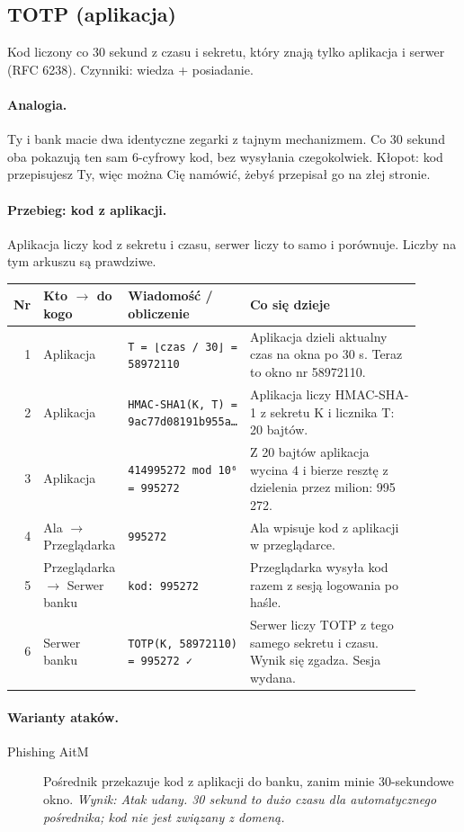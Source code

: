 \subsection{TOTP (aplikacja)}
\label{sec:mech-totp}
Kod liczony co 30 sekund z czasu i sekretu, który znają tylko aplikacja i serwer (RFC 6238). Czynniki: wiedza + posiadanie. \cite{S3,S4,N1,A1,P7,P8,N4}

\paragraph{Analogia.} Ty i bank macie dwa identyczne zegarki z tajnym mechanizmem. Co 30 sekund oba pokazują ten sam 6-cyfrowy kod, bez wysyłania czegokolwiek. Kłopot: kod przepisujesz Ty, więc można Cię namówić, żebyś przepisał go na złej stronie.

\paragraph{Przebieg: kod z aplikacji.} Aplikacja liczy kod z sekretu i czasu, serwer liczy to samo i porównuje. Liczby na tym arkuszu są prawdziwe.
\begingroup\footnotesize
\begin{longtable}{@{}r p{0.2\linewidth} p{0.24\linewidth} p{0.46\linewidth}@{}}
\toprule
Nr & Kto $\rightarrow$ do kogo & Wiadomość / obliczenie & Co się dzieje \\
\midrule
\endhead
1 & Aplikacja & \texttt{T = ⌊czas / 30⌋ = 58972110} & Aplikacja dzieli aktualny czas na okna po 30 s. Teraz to okno nr 58972110. \\
2 & Aplikacja & \texttt{HMAC-SHA1(K, T) = 9ac77d08191b955a…} & Aplikacja liczy HMAC-SHA-1 z sekretu K i licznika T: 20 bajtów. \\
3 & Aplikacja & \texttt{414995272 mod 10⁶ = 995272} & Z 20 bajtów aplikacja wycina 4 i bierze resztę z dzielenia przez milion: 995 272. \\
4 & Ala $\rightarrow$ Przeglądarka & \texttt{995272} & Ala wpisuje kod z aplikacji w przeglądarce. \\
5 & Przeglądarka $\rightarrow$ Serwer banku & \texttt{kod: 995272} & Przeglądarka wysyła kod razem z sesją logowania po haśle. \\
6 & Serwer banku & \texttt{TOTP(K, 58972110) = 995272 ✓} & Serwer liczy TOTP z tego samego sekretu i czasu. Wynik się zgadza. Sesja wydana. \\
\bottomrule
\end{longtable}
\endgroup

\paragraph{Warianty ataków.}
\begin{description}
\item[Phishing AitM] Pośrednik przekazuje kod z aplikacji do banku, zanim minie 30-sekundowe okno. \emph{Wynik: Atak udany. 30 sekund to dużo czasu dla automatycznego pośrednika; kod nie jest związany z domeną.}
\end{description}

